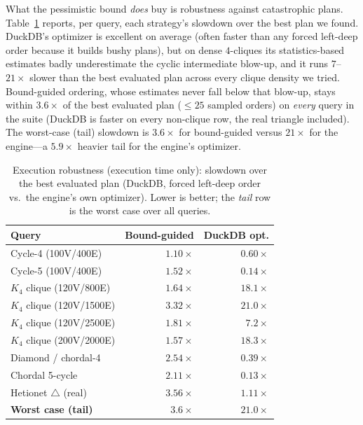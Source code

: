 \documentclass[sigconf, nonacm, acmthm=false]{acmart}
\begin{document}
What the pessimistic bound \emph{does} buy is robustness against
catastrophic plans. Table~\ref{tab:robust} reports, per query, each
strategy's slowdown over the best plan we found. DuckDB's optimizer is
excellent on average (often faster than any forced left-deep order
because it builds bushy plans), but on dense $4$-cliques its
statistics-based estimates badly underestimate the cyclic intermediate
blow-up, and it runs $7$--$21\times$ slower than the best evaluated plan across every clique density we tried. Bound-guided ordering, whose estimates never fall below that blow-up, stays within $3.6\times$ of the best evaluated plan (${\le}25$ sampled orders) on
\emph{every} query in the suite (DuckDB is faster on every non-clique row, the real triangle included). The worst-case (tail) slowdown is
$3.6\times$ for bound-guided versus $21\times$ for the engine---a
$5.9\times$ heavier tail for the engine's optimizer.

\begin{table}[t]
\centering
\caption{Execution robustness (execution time only): slowdown over the best evaluated plan
(DuckDB, forced left-deep order vs.\ the engine's own optimizer).
Lower is better; the \emph{tail} row is the worst case over all queries.}
\label{tab:robust}
\begin{tabular}{@{}lrr@{}}
\toprule
Query & Bound-guided & DuckDB opt. \\
\midrule
Cycle-4 (100V/400E)        & $1.10\times$ & $0.60\times$ \\
Cycle-5 (100V/400E)        & $1.52\times$ & $0.14\times$ \\
$K_4$ clique (120V/800E)      & $1.64\times$ & $18.1\times$ \\
$K_4$ clique (120V/1500E)     & $3.32\times$ & $21.0\times$ \\
$K_4$ clique (120V/2500E)     & $1.81\times$ & $7.2\times$ \\
$K_4$ clique (200V/2000E)     & $1.57\times$ & $18.3\times$ \\
Diamond / chordal-4        & $2.54\times$ & $0.39\times$ \\
Chordal 5-cycle            & $2.11\times$ & $0.13\times$ \\
Hetionet $\triangle$ (real)& $3.56\times$ & $1.11\times$ \\
\midrule
\textbf{Worst case (tail)} & $\mathbf{3.6\times}$ & $\mathbf{21.0\times}$ \\
\bottomrule
\end{tabular}
\end{table}
\end{document}
